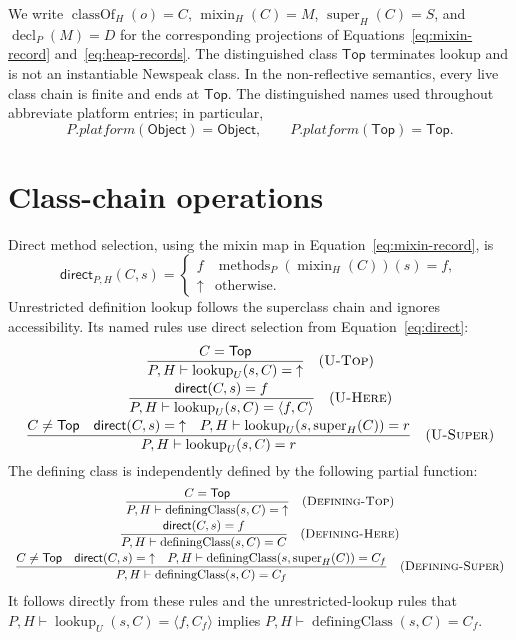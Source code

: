 \documentclass[11pt]{article}
\numberwithin{equation}{section}
\newcommand{\kw}[1]{\ensuremath{\mathsf{#1}}}
\newcommand{\undef}{\mathord{\uparrow}}
\newcommand{\Top}{\kw{Top}}
\newcommand{\Object}{\kw{Object}}
\newcommand{\classof}{\mathop{\mathrm{classOf}}}
\newcommand{\super}{\mathop{\mathrm{super}}}
\newcommand{\mixin}{\mathop{\mathrm{mixin}}}
\newcommand{\decl}{\mathop{\mathrm{decl}}}
\newcommand{\methods}{\mathop{\mathrm{methods}}}
\newcommand{\lookup}{\mathop{\mathrm{lookup}}}
\newcommand{\definingClass}{\mathop{\mathrm{definingClass}}}
\newcommand{\rulelabel}[1]{\textsc{#1}}
\begin{document}
We write $\classof_H(o)=C$, $\mixin_H(C)=M$, $\super_H(C)=S$, and
$\decl_P(M)=D$ for the corresponding projections of
Equations~\eqref{eq:mixin-record} and~\eqref{eq:heap-records}.  The distinguished
class $\Top$ terminates lookup and is not an instantiable Newspeak class.  In
the non-reflective semantics, every live class chain is finite and ends at
$\Top$.
The distinguished names used throughout abbreviate platform entries; in
particular,
\begin{equation}\label{eq:distinguished-platform-classes}
 P.\mathit{platform}(\kw{Object})=\Object,
 \qquad P.\mathit{platform}(\kw{Top})=\Top.
\end{equation}

\section{Class-chain operations}
\label{sec:class-chain}

Direct method selection, using the mixin map in
Equation~\eqref{eq:mixin-record}, is
\begin{equation}\label{eq:direct}
 \mathsf{direct}_{P,H}(C,s)=
 \begin{cases}
   f & \methods_P(\mixin_H(C))(s)=f,\\
   \undef & \text{otherwise.}
 \end{cases}
\end{equation}
Unrestricted definition lookup follows the superclass chain and ignores
accessibility.  Its named rules use direct selection from
Equation~\eqref{eq:direct}:
\[
\begin{array}{c}
\dfrac{C=\Top}{P,H\vdash \lookup_U(s,C)=\undef}
\quad(\rulelabel{U-Top})\\[2ex]
\dfrac{\mathsf{direct}(C,s)=f}{P,H\vdash \lookup_U(s,C)=\langle f,C\rangle}
\quad(\rulelabel{U-Here})\\[2ex]
\dfrac{C\ne\Top\quad \mathsf{direct}(C,s)=\undef\quad
       P,H\vdash\lookup_U(s,\super_H(C))=r}
      {P,H\vdash\lookup_U(s,C)=r}
\quad(\rulelabel{U-Super})
\end{array}
\]
The defining class is independently defined by the following partial
function:
\[
\begin{array}{c}
\dfrac{C=\Top}
      {P,H\vdash\definingClass(s,C)=\undef}
\quad(\rulelabel{Defining-Top})\\[2ex]
\dfrac{\mathsf{direct}(C,s)=f}
      {P,H\vdash\definingClass(s,C)=C}
\quad(\rulelabel{Defining-Here})\\[2ex]
\dfrac{C\ne\Top\quad \mathsf{direct}(C,s)=\undef\quad
       P,H\vdash\definingClass(s,\super_H(C))=C_f}
      {P,H\vdash\definingClass(s,C)=C_f}
\quad(\rulelabel{Defining-Super})
\end{array}
\]
It follows directly from these rules and the unrestricted-lookup rules that
$P,H\vdash\lookup_U(s,C)=\langle f,C_f\rangle$ implies
$P,H\vdash\definingClass(s,C)=C_f$.
\end{document}
